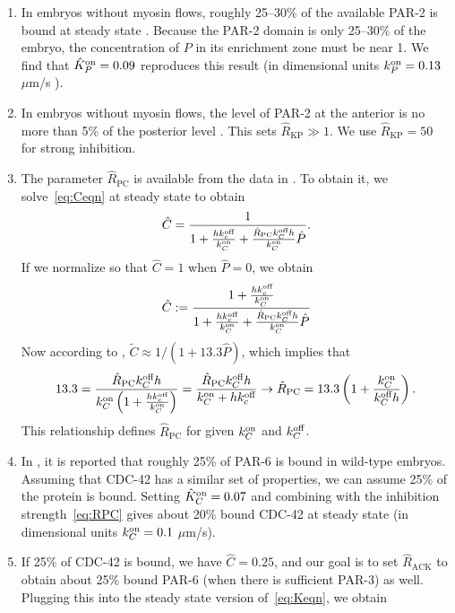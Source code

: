 \documentclass[11pt]{article}
\newcommand{\6}[1]{#1_{\text{6}}}
\newcommand{\3}[1]{#1_{\text{3}}}
\begin{document}
\begin{enumerate}
\item In embryos without myosin flows, roughly 25--30\% of the available PAR-2 is bound at steady state \cite[Fig.~S3]{gross2019guiding}. Because the PAR-2 domain is only 25--30\% of the embryo, the concentration of $P$ in its enrichment zone must be near 1. We find that $\hat{K}^\text{on}_P=0.09$ reproduces this result (in dimensional units $k^\text{on}_P=0.13$ $\mu$m/s \cite{gross2019guiding}).
\item In embryos without myosin flows, the level of PAR-2 at the anterior is no more than 5\% of the posterior level \cite[Fig.~2c]{gross2019guiding}. This sets $\hat R_\text{KP} \gg 1$. We use $\hat R_\text{KP}=50$ for strong inhibition. 
\item The parameter $\hat{R}_\text{PC}$ is available from the data in \cite{sailer2015dynamic}. To obtain it, we solve\ \eqref{eq:Ceqn} at steady state to obtain
\begin{equation}
\hat C = \frac{1}{1+\frac{h k^\text{off}_c}{k^\text{on}_C}+\frac{\hat R_\text{PC}k^\text{off}_C h}{k^\text{on}_C} \hat P}. 
\end{equation}
If we normalize so that $\hat C=1$ when $\hat P=0$, we obtain
\begin{equation*}
\tilde C :=   \frac{1+\frac{h k^\text{off}_c}{k^\text{on}_C}}{1+\frac{h k^\text{off}_c}{k^\text{on}_C}+\frac{\hat R_\text{PC}k^\text{off}_C h}{k^\text{on}_C} \hat P}
\end{equation*} 
Now according to \cite{sailer2015dynamic}, $\tilde{C} \approx 1/(1+13.3\hat{P})$, which implies that 
\begin{equation}
\label{eq:RPC}
13.3 = \frac{\hat R_\text{PC}k^\text{off}_C h}{k^\text{on}_C\left(1+\frac{h k^\text{off}_c}{k^\text{on}_C}\right)}= \frac{\hat R_\text{PC}k^\text{off}_C h}{k^\text{on}_C+h k^\text{off}_c} \rightarrow \hat R_\text{PC}=13.3\left(1+\frac{k^\text{on}_C}{k^\text{off}_C h}\right).
\end{equation}
This relationship defines $\hat R_\text{PC}$ for given $k^\text{on}_C$ and $k^\text{off}_C$. 
\item In \cite[Fig.~S3i]{gross2019guiding}, it is reported that roughly 25\% of PAR-6 is bound in wild-type embryos. Assuming that CDC-42 has a similar set of properties, we can assume 25\% of the protein is bound. Setting $\hat{K}^\text{on}_C=0.07$ and combining with the inhibition strength\ \eqref{eq:RPC} gives about 20\% bound CDC-42 at steady state (in dimensional units $k^\text{on}_C=0.1$ $\mu$m/s).
\item If 25\% of CDC-42 is bound, we have $\hat C = 0.25$, and our goal is to set $\hat{R}_\text{ACK}$ to obtain about 25\% bound PAR-6 (when there is sufficient PAR-3) as well. Plugging this into the steady state version of\ \eqref{eq:Keqn}, we obtain

\end{enumerate}
\end{document}
